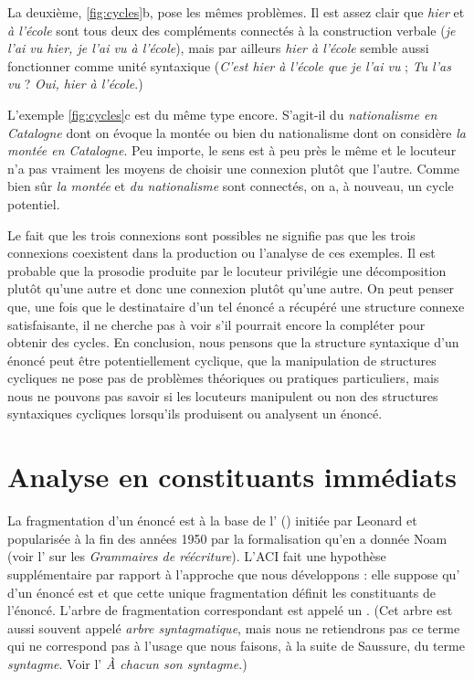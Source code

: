 {La deuxième, \ref{fig:cycles}b, pose les mêmes problèmes. Il est assez clair que \textit{hier} et \textit{à l’école} sont tous deux des compléments connectés à la construction verbale (\textit{je l’ai vu hier, je l’ai vu à l’école}), mais par ailleurs \textit{hier à l’école} semble aussi fonctionner comme unité syntaxique (\textit{C’est hier à l’école que je l’ai vu} ; \textit{Tu l’as vu} ? \textit{Oui, hier à l’école}.)

L'exemple \ref{fig:cycles}c est du même type encore. S’agit-il du \textit{nationalisme en Catalogne} dont on évoque la montée ou bien du nationalisme dont on considère \textit{la montée en Catalogne}. Peu importe, le sens est à peu près le même et le locuteur n’a pas vraiment les moyens de choisir une connexion plutôt que l’autre. Comme bien sûr \textit{la montée} et \textit{du nationalisme} sont connectés, on a, à nouveau, un cycle potentiel.

Le fait que les trois connexions sont possibles ne signifie pas que les trois connexions coexistent dans la production ou l’analyse de ces exemples. Il est probable que la prosodie produite par le locuteur privilégie une décomposition plutôt qu’une autre et donc une connexion plutôt qu’une autre. On peut penser que, une fois que le destinataire d’un tel énoncé a récupéré une structure connexe satisfaisante, il ne cherche pas à voir s’il pourrait encore la compléter pour obtenir des cycles. En conclusion, nous pensons que la structure syntaxique d’un énoncé peut être potentiellement cyclique, que la manipulation de structures cycliques ne pose pas de problèmes théoriques ou pratiques particuliers, mais nous ne pouvons pas savoir si les locuteurs manipulent ou non des structures syntaxiques cycliques lorsqu’ils produisent ou analysent un énoncé.
}
\section{Analyse en constituants immédiats}\label{sec:3.2.25}

La fragmentation d’un énoncé est à la base de l’ () initiée par Leonard \citet{bloomfield1933language} et popularisée à la fin des années 1950 par la formalisation qu’en a donnée Noam \citet{chomsky1957syntactic} (voir l’ sur les \textit{Grammaires de réécriture}). L’ACI fait une hypothèse supplémentaire par rapport à l’approche que nous développons : elle suppose qu’ d’un énoncé est  et que cette unique fragmentation définit les constituants de l’énoncé. L’arbre de fragmentation correspondant est appelé un . (Cet arbre est aussi souvent appelé \textit{arbre syntagmatique}, mais nous ne retiendrons pas ce terme qui ne correspond pas à l’usage que nous faisons, à la suite de Saussure, du terme \textit{syntagme}. Voir l’ \textit{À chacun son syntagme}.)

